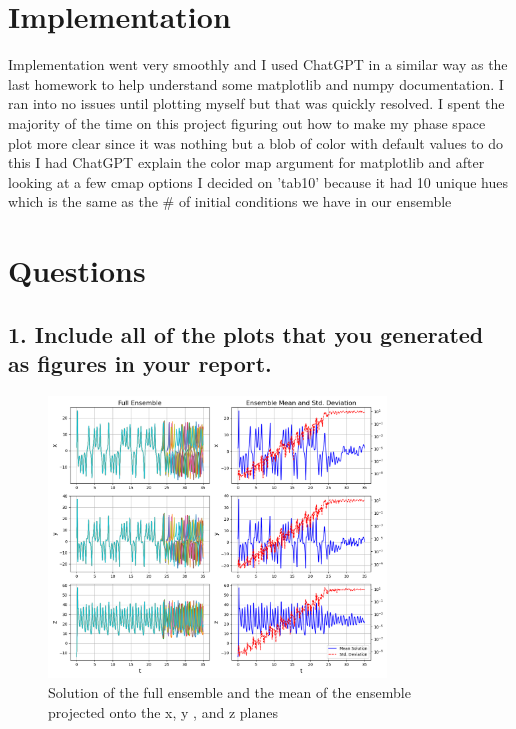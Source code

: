 \documentclass{article}
\begin{document}
\section*{Implementation}
Implementation went very smoothly and I used ChatGPT in a similar way as the last homework
to help understand some matplotlib and numpy documentation. I ran into no issues until plotting myself
but that was quickly resolved. I spent the majority of the time on this project figuring out how to make
my phase space plot more clear since it was nothing but a blob of color with default values
to do this I had ChatGPT explain the color map argument for matplotlib and after looking at a few cmap options
I decided on 'tab10' because it had 10 unique hues which is the same as the \# of initial conditions we have in our 
ensemble

\section*{Questions}
\subsection*{1. Include all of the plots that you generated as figures in your report.}
    \begin{figure}[htbp]
        \centering
        \includegraphics[width=0.8\textwidth]{../solutions.png}
        \caption{Solution of the full ensemble and the mean of the ensemble projected onto the x, y , and z planes}
        \label{fig: solutions.png}
    \end{figure}
    
\end{document}
